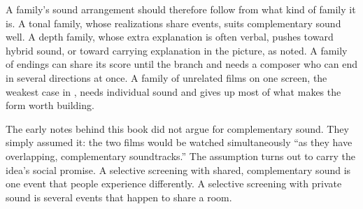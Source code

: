 A family's sound arrangement should therefore follow from what kind of family it is. A tonal family, whose realizations share events, suits complementary sound well. A depth family, whose extra explanation is often verbal, pushes toward hybrid sound, or toward carrying explanation in the picture, as  noted. A family of endings can share its score until the branch and needs a composer who can end in several directions at once. A family of unrelated films on one screen, the weakest case in , needs individual sound and gives up most of what makes the form worth building.

The early notes behind this book did not argue for complementary sound. They simply assumed it: the two films would be watched simultaneously ``as they have overlapping, complementary soundtracks.'' The assumption turns out to carry the idea's social promise. A selective screening with shared, complementary sound is one event that people experience differently. A selective screening with private sound is several events that happen to share a room.
